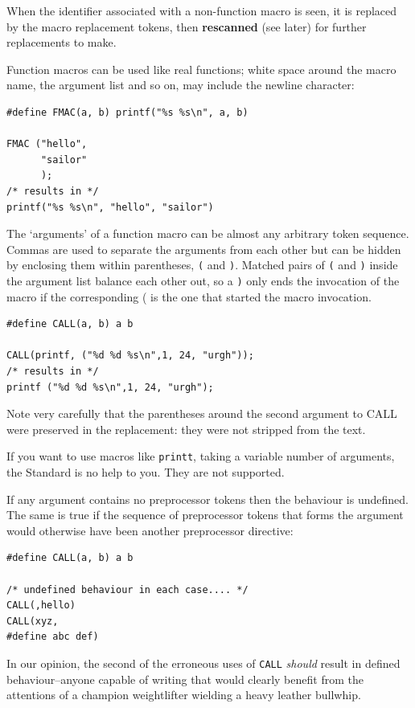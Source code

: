     When the identifier associated with a non-function macro is seen, it
     is replaced by the macro replacement tokens, then \textbf{rescanned}
     (see later) for further replacements to make.


    Function macros can be used like real functions; white space around
     the macro name, the argument list and so on, may include the newline
     character:


    \begin{Verbatim}
#define FMAC(a, b) printf("%s %s\n", a, b)

FMAC ("hello",
      "sailor"
      );
/* results in */
printf("%s %s\n", "hello", "sailor")
\end{Verbatim}

    The `arguments' of a function macro can be almost any arbitrary
     token sequence. Commas are used to separate the arguments from each
     other but can be hidden by enclosing them within parentheses,
     \texttt{(} and \texttt{)}. Matched pairs of \texttt{(} and
     \texttt{)} inside the argument list balance each other out, so
     a \texttt{)} only ends the invocation of the macro if the
     corresponding ( is the one that started the macro invocation.


    \begin{Verbatim}
#define CALL(a, b) a b

CALL(printf, ("%d %d %s\n",1, 24, "urgh"));
/* results in */
printf ("%d %d %s\n",1, 24, "urgh");
\end{Verbatim}

    Note very carefully that the parentheses around the second argument
     to CALL were preserved in the replacement: they were not stripped from
     the text.


    If you want to use macros like \texttt{printt}, taking a variable
     number of arguments, the Standard is no help to you. They are not
     supported.


    If any argument contains no preprocessor tokens then the behaviour is
     undefined. The same is true if the sequence of preprocessor tokens that
     forms the argument would otherwise have been another preprocessor
     directive:


    \begin{Verbatim}
#define CALL(a, b) a b

/* undefined behaviour in each case.... */
CALL(,hello)
CALL(xyz,
#define abc def)
\end{Verbatim}

    In our opinion, the second of the erroneous uses of \texttt{CALL}
     \textit{should} result in defined behaviour--anyone capable of
     writing that would clearly benefit from the attentions of a champion
     weightlifter wielding a heavy leather bullwhip.


